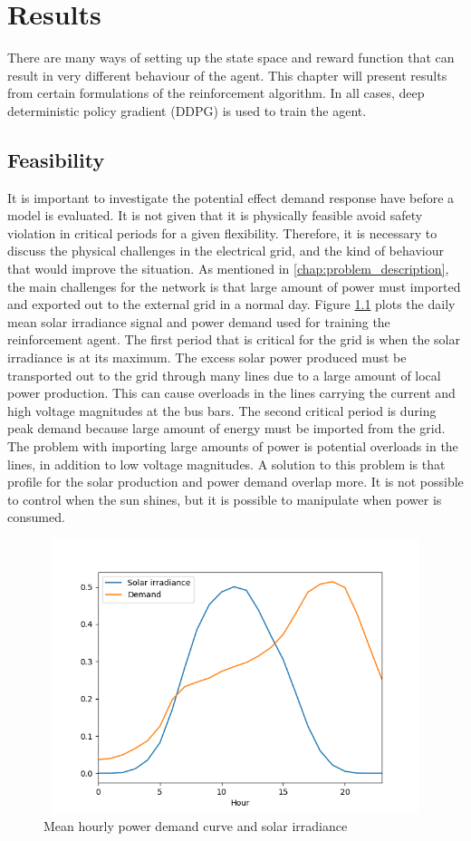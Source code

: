 \documentclass[class=book, crop=false]{standalone}
\begin{document}
\chapter{Results}\label{chapter:results}

There are many ways of setting up the state space and reward function that can result in very different behaviour of the agent. This chapter will present results from certain formulations of the reinforcement algorithm. In all cases, deep deterministic policy gradient (DDPG) is used to train the agent. 

\section{Feasibility}
It is important to investigate the potential effect demand response have before a model is evaluated. It is not given that it is physically feasible avoid safety violation in critical periods for a given flexibility. Therefore, it is necessary to discuss the physical challenges in the electrical grid, and the kind of behaviour that would improve the situation. As mentioned in \ref{chap:problem_description}, the main challenges for the network is that large amount of power must imported and exported out to the external grid in a normal day. Figure \ref{fig:results:demand_and_solar} plots the daily mean solar irradiance signal and power demand used for training the reinforcement agent. The first period that is critical for the grid is when the solar irradiance is at its maximum. The excess solar power produced must be transported out to the grid through many lines due to a large amount of local power production. This can cause overloads in the lines carrying the current and high voltage magnitudes at the bus bars. The second critical period is during peak demand because large amount of energy must be imported from the grid. The problem with importing large amounts of power is potential overloads in the lines, in addition to low voltage magnitudes. A solution to this problem is that profile for the solar production and power demand overlap more. It is not possible to control when the sun shines, but it is possible to manipulate when power is consumed.
\begin{figure}[h]
    \center
\includegraphics[height=8cm, width=12cm]{figures/demand_and_solar.png}
    \caption[size = 9]{Mean hourly power demand curve and solar irradiance}
    \label{fig:results:demand_and_solar}
\end{figure}
\end{document}
